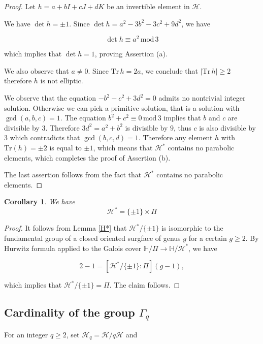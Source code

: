 \documentclass[12pt]{amsart}
\newcommand{\HP}{\mathbb{H}}
\newcommand{\Tr}{{\mathrm {Tr}}}
\renewcommand{\mod}{\,\mathrm{mod}\,}
\newtheorem{cor}[lemma]{Corollary}
\newcommand{\cH}{\mathcal{H}}
\begin{document}
\begin{proof} Let $h=a+bI+cJ+dK$ be an invertible element
in $\cH$. 

We have  $\det h=\pm1$. Since 
$\det h=a^2-3b^2-3c^2+9d^2$, we have

$$\det h\equiv a^2 \mod 3$$

\noindent which implies that $\det h=1$, proving Assertion (a).



We also observe that $a\neq 0$. Since $\Tr\, h=2a$, we
conclude that $\mid\Tr\, h\mid\geq 2$ therefore
$h$ is not elliptic.

We observe that the equation
$-b^2-c^2+3 d^2=0$ admits no nontrivial integer solution.
Otherwise we can pick a primitive solution, that is a solution
with $\gcd(a,b,c)=1$. The equation
$b^2+c^2\equiv 0\mod 3$ implies that $b$ and $c$ are divisible by $3$.
Therefore $3 d^2=a^2+b^2$ is divisible by $9$, thus $c$ is also divisible by
$3$ which contradicts that $\gcd(b,c,d)=1$. Therefore
any element $h$ with $\Tr(h)=\pm 2$ is equal to $\pm1$,
which means that $\cH^*$ contains no parabolic elements,
which completes the proof of Assertion (b).

The last assertion follows from the fact that  $\cH^*$ contains no parabolic elements.
\end{proof}


\begin{cor} \label{Bers}We have
$$\cH^*=\{ \pm1 \}\times \Pi$$
\end{cor}

\begin{proof} 
It follows from Lemma \ref{H*} that $\cH^*/\{\pm1\}$ is isomorphic to
the fundamental group of a closed oriented surgface of genus $g$ for a certain $g\geq 2$.
By Hurwitz formula applied to the Galois cover
$\HP/\Pi\to \HP/\cH^*$, we have

$$2-1 =[\cH^*/\{\pm1\}:\Pi] (g-1),$$

\noindent which implies that $\cH^*/\{\pm1\}=\Pi$. The claim follows.
\end{proof}








\subsection{Cardinality of the  group $\Gamma_q$}

For an integer $q\geq 2$, set
$\cH_q=\cH/q\cH$ and
\end{document}
